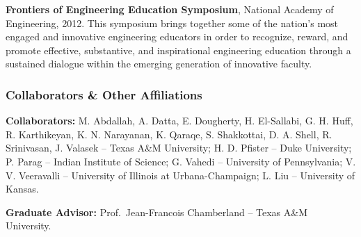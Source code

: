 \documentclass[11pt]{article}
\begin{document}
\textbf{Frontiers of Engineering Education Symposium}, National Academy of Engineering, 2012.
This symposium brings together some of the nation's most engaged and innovative engineering educators in order to recognize, reward, and promote effective, substantive, and inspirational engineering education through a sustained dialogue within the emerging generation of innovative faculty.


\subsubsection*{Collaborators \& Other Affiliations}

\textbf{Collaborators:}
M. Abdallah,
A. Datta,
E. Dougherty,
H. El-Sallabi,
G. H. Huff,
R. Karthikeyan,
K. N. Narayanan,
K. Qaraqe,
S. Shakkottai,
D. A. Shell,
R. Srinivasan,
J. Valasek
-- Texas A\&M University;
H. D. Pfister -- Duke University;
P. Parag -- Indian Institute of Science;
G. Vahedi -- University of Pennsylvania;
V. V. Veeravalli -- University of Illinois at Urbana-Champaign;
L. Liu -- University of Kansas.

\textbf{Graduate Advisor:}
Prof.~Jean-Francois Chamberland -- Texas A\&M University.
\end{document}
